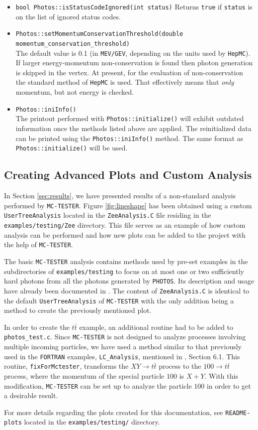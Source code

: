 \documentclass[]{Photos_interface_design}
\begin{document}
\begin{itemize}
  \item {\tt bool Photos::isStatusCodeIgnored(int status)} Returns {\tt true} if {\tt status}
        is on the list of ignored status codes.
  \item {\tt Photos::setMomentumConservationThreshold(double momentum\_{}conservation\_{}threshold)} \\
        The default value is 0.1 (in {\tt MEV/GEV}, depending
on the units used by {\tt HepMC}). If larger energy-momentum non-conservation
        is found then photon generation is skipped in the vertex. 
        At present, for the evaluation of non-conservation  the standard method of {\tt HepMC}
        is used. That effectively means that {\it only} momentum, but not energy is checked.
  \item {\tt Photos::iniInfo()} \\
        The printout performed with  {\tt Photos::initialize()}  will exhibit 
        outdated information
        once the methods listed above are applied. The reinitialized data can be printed
        using the {\tt Photos::iniInfo()} method.
        The same format as {\tt Photos::initialize()}  will be used.		
\end{itemize}

\subsection{Creating Advanced Plots and Custom Analysis}
\label{App:Plots}

In Section \ref{sec:results}, we have presented results of a non-standard
analysis performed by {\tt MC-TESTER}. Figure \ref{fig:lineshape} has been
obtained using a custom {\tt UserTreeAnalysis} located in the {\tt ZeeAnalysis.C} file
residing in the {\tt examples/testing/Zee} directory. This file serves as an
example of how custom analysis can be performed and how new plots can be
added to the project with the help of {\tt MC-TESTER}.

The basic {\tt MC-TESTER} analysis contains methods used by pre-set examples
in the subdirectories of {\tt examples/testing} to focus on at most one or two 
sufficiently hard photons from all the photons generated
by {\tt PHOTOS}. Its description and usage have already been documented in \cite{Davidson:2008ma}.
The content of {\tt ZeeAnalysis.C} is identical to the default {\tt UserTreeAnalysis}
of {\tt MC-TESTER} with the only addition being a method to create
the previously mentioned plot.

In order to create the $t \bar t$ example, an additional routine had to be added to {\tt photos\_test.c}.
Since {\tt MC-TESTER} is not designed to analyze processes involving
multiple incoming particles, we have used a method similar to that previously
used in the {\tt FORTRAN} examples, {\tt LC\_Analysis}, mentioned in \cite{Golonka:2002rz}, Section 6.1.
This routine, {\tt fixForMctester}, transforms the $X Y \rightarrow t \bar t$
process to the $100 \rightarrow t \bar t$ process,
where the momentum of the
special particle $100$ is $X + Y$. With this modification, {\tt MC-TESTER} can be set
up to analyze the particle $100$ in order to get a desirable result.

For more details regarding the plots created for this documentation, see
{\tt README-plots} located in the {\tt examples/testing/} directory.

\end{document}
